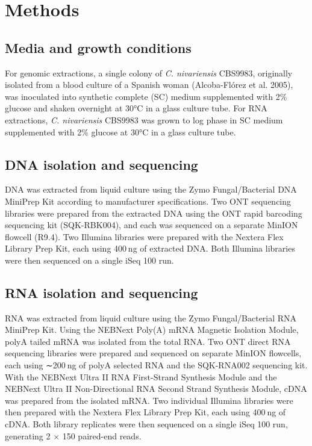 \section{Methods}
\label{sec:methods}

\subsection{Media and growth conditions}
\label{sec:methods}

For genomic extractions, a single colony of \textit{C. nivariensis} CBS9983, originally isolated from a blood culture of a Spanish woman (Alcoba-Flórez et al. 2005), was inoculated into synthetic complete (SC) medium supplemented with 2\% glucose and shaken overnight at 30°C in a glass culture tube. For RNA extractions, \textit{C. nivariensis} CBS9983 was grown to log phase in SC medium supplemented with 2\% glucose at 30°C in a glass culture tube.

\subsection{DNA isolation and sequencing}
\label{sec:methods}

DNA was extracted from liquid culture using the Zymo Fungal/Bacterial DNA MiniPrep Kit according to manufacturer specifications. Two ONT sequencing libraries were prepared from the extracted DNA using the ONT rapid barcoding sequencing kit (SQK-RBK004), and each was sequenced on a separate MinION flowcell (R9.4). Two Illumina libraries were prepared with the Nextera Flex Library Prep Kit, each using 400 ng of extracted DNA. Both Illumina libraries were then sequenced on a single iSeq 100 run.

\subsection{RNA isolation and sequencing}
\label{sec:methods}

RNA was extracted from liquid culture using the Zymo Fungal/Bacterial RNA MiniPrep Kit. Using the NEBNext Poly(A) mRNA Magnetic Isolation Module, polyA tailed mRNA was isolated from the total RNA. Two ONT direct RNA sequencing libraries were prepared and sequenced on separate MinION flowcells, each using ∼200 ng of polyA selected RNA and the SQK-RNA002 sequencing kit. With the NEBNext Ultra II RNA First-Strand Synthesis Module and the NEBNext Ultra II Non-Directional RNA Second Strand Synthesis Module, cDNA was prepared from the isolated mRNA. Two individual Illumina libraries were then prepared with the Nextera Flex Library Prep Kit, each using 400 ng of cDNA. Both library replicates were then sequenced on a single iSeq 100 run, generating 2 × 150 paired-end reads.

